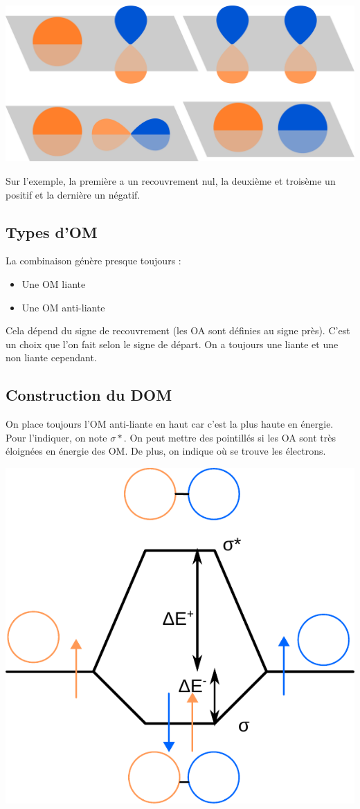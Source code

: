 \documentclass[french]{yLectureNote}
\begin{document}
\includegraphics[scale=0.1]{recouvrement}

Sur l'exemple, la première a un recouvrement nul, la deuxième et troisème un positif et la dernière un négatif.
\subsection{Types d'OM}
La combinaison génère presque toujours :
\begin{itemize}
 \item Une OM liante
 \item Une OM anti-liante
\end{itemize}
Cela dépend du signe de recouvrement (les OA sont définies au signe près). C'est un choix que l'on fait selon le signe de départ. On a toujours une liante et une non liante cependant.
\subsection{Construction du DOM}
On place toujours l'OM anti-liante en haut car c'est la plus haute en énergie. Pour l'indiquer, on note $\sigma *$. On peut mettre des pointillés si les OA sont très éloignées en énergie des OM. De plus, on indique où se trouve les électrons.

\includegraphics[scale=0.5]{s00}
\end{document}
